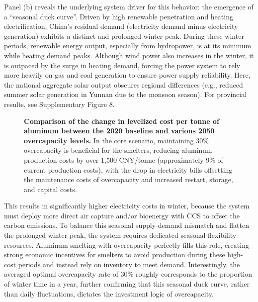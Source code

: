 \documentclass[preprint]{elsarticle}
\begin{document}
Panel (b) reveals the underlying system driver for this behavior: the emergence of a ``seasonal duck curve''. Driven by high renewable penetration and heating electrification, China's residual demand (electricity demand minus electricity generation) exhibits a distinct and prolonged winter peak. During these winter periods, renewable energy output, especially from hydropower, is at its minimum while heating demand peaks. Although wind power also increases in the winter, it is outpaced by the surge in heating demand, forcing the power system to rely more heavily on gas and coal generation to ensure power supply reliability. Here, the national aggregate solar output obscures regional differences (e.g., reduced summer solar generation in Yunnan due to the monsoon season). For provincial results, see Supplementary Figure 8.

\begin{figure}[!t]
\centering
\caption{\textbf{Comparison of the change in levelized cost per tonne of aluminum between the 2020 baseline and various 2050 overcapacity levels.} In the core scenario, maintaining 30\% overcapacity is beneficial for the smelters, reducing aluminum production costs by over 1,500 CNY/tonne (approximately 9\% of current production costs), with the drop in electricity bills offsetting the maintenance costs of overcapacity and increased restart, storage, and capital costs.}
\label{fig_cost_reduction}
\end{figure}

This results in significantly higher electricity costs in winter, because the system must deploy more direct air capture and/or bioenergy with CCS to offset the carbon emissions. To balance this seasonal supply-demand mismatch and flatten the prolonged winter peak, the system requires dedicated seasonal flexibility resources. Aluminum smelting with overcapacity perfectly fills this role, creating strong economic incentives for smelters to avoid production during these high-cost periods and instead rely on inventory to meet demand. Interestingly, the averaged optimal overcapacity rate of 30\% roughly corresponds to the proportion of winter time in a year, further confirming that this seasonal duck curve, rather than daily fluctuations, dictates the investment logic of overcapacity. 
\end{document}
